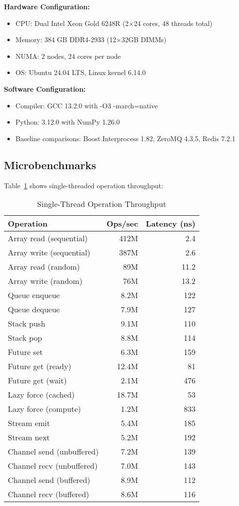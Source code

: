 \documentclass[11pt]{article}
\begin{document}
\textbf{Hardware Configuration:}
\begin{itemize}
\item CPU: Dual Intel Xeon Gold 6248R (2×24 cores, 48 threads total)
\item Memory: 384 GB DDR4-2933 (12×32GB DIMMs)
\item NUMA: 2 nodes, 24 cores per node
\item OS: Ubuntu 24.04 LTS, Linux kernel 6.14.0
\end{itemize}

\textbf{Software Configuration:}
\begin{itemize}
\item Compiler: GCC 13.2.0 with -O3 -march=native
\item Python: 3.12.0 with NumPy 1.26.0
\item Baseline comparisons: Boost.Interprocess 1.82, ZeroMQ 4.3.5, Redis 7.2.1
\end{itemize}

\subsection{Microbenchmarks}

Table~\ref{tab:throughput} shows single-threaded operation throughput:

\begin{table}[h]
\centering
\caption{Single-Thread Operation Throughput}
\label{tab:throughput}
\begin{tabular}{lrr}
\toprule
Operation & Ops/sec & Latency (ns) \\
\midrule
Array read (sequential) & 412M & 2.4 \\
Array write (sequential) & 387M & 2.6 \\
Array read (random) & 89M & 11.2 \\
Array write (random) & 76M & 13.2 \\
Queue enqueue & 8.2M & 122 \\
Queue dequeue & 7.9M & 127 \\
Stack push & 9.1M & 110 \\
Stack pop & 8.8M & 114 \\
Future set & 6.3M & 159 \\
Future get (ready) & 12.4M & 81 \\
Future get (wait) & 2.1M & 476 \\
Lazy force (cached) & 18.7M & 53 \\
Lazy force (compute) & 1.2M & 833 \\
Stream emit & 5.4M & 185 \\
Stream next & 5.2M & 192 \\
Channel send (unbuffered) & 7.2M & 139 \\
Channel recv (unbuffered) & 7.0M & 143 \\
Channel send (buffered) & 8.9M & 112 \\
Channel recv (buffered) & 8.6M & 116 \\
\bottomrule
\end{tabular}
\end{table}
\end{document}
